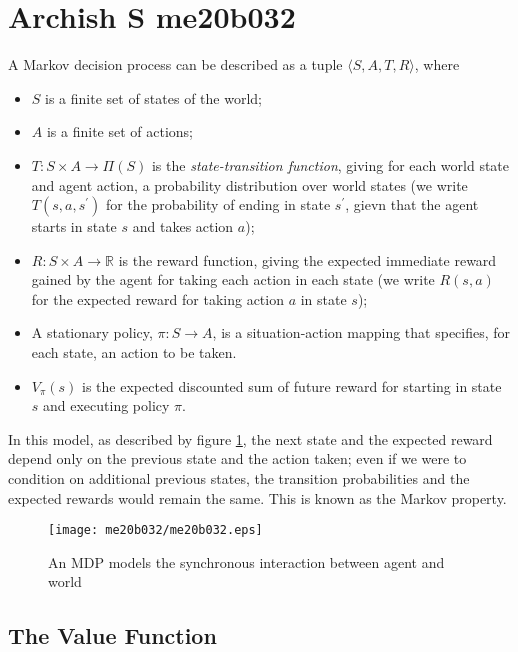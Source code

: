 \section{Archish S me20b032}
A Markov decision process \cite{POMDP} can be described as a tuple $ \langle S, A, T, R \rangle $, where
\begin{itemize}
	\item $S$ is a finite set of states of the world;
	\item $A$ is a finite set of actions;
	\item $T : S \times A \rightarrow \Pi(S)$ is the \textit{state-transition function}, giving for each world state and agent action, a probability distribution over world states (we write $T(s,a,s^\prime)$ for the probability of ending in state $s^\prime$, gievn that the agent starts in state $s$ and takes action $a$);
	\item $R : S \times A \rightarrow \mathbb{R}$ is the reward function, giving the expected immediate reward gained by the agent for taking each action in each state (we write $R(s,a)$ for the expected reward for taking action $a$ in state $s$);
	\item A stationary policy, $ \pi : S \rightarrow A $, is a situation-action mapping that specifies, for each state, an action to be taken.
	\item $V_{\pi}(s)$ is the expected discounted sum of future reward for starting in state $s$ and executing policy $\pi$.
\end{itemize}

In this model, as described by figure \ref{fig:MDP}, the next state and the expected reward depend only on the previous state and the action taken; even if we were to condition on additional previous states, the transition probabilities and the expected rewards would remain the same. This is known as the Markov property.

\begin{center}
\begin{figure}[!ht]
	\texttt{[image: me20b032/me20b032.eps]}
  	\caption{An MDP models the synchronous interaction between agent and world}
	\label{fig:MDP}
\end{figure}
\end{center}

\subsection{The Value Function}

